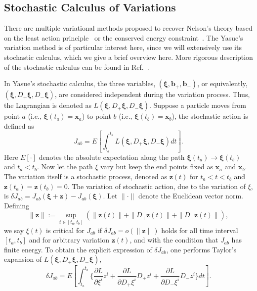 \documentclass[%
 aip, 
 amsmath,amssymb,amsthm,
 nofootinbib,
 reprint,
]{revtex4-1}
\begin{document}
\subsection{Stochastic Calculus of Variations}
\label{calculus}
There are multiple variational methods proposed to recover Nelson's theory based on the least action principle~\cite{Yasue, Guerra, Pavon} or the conserved energy constraint~\cite{Caticha}. The Yasue's variation method is of particular interest here, since we will extensively use its stochastic calculus, which we give a brief overview here. More rigorous description of the stochastic calculus can be found in Ref.~\cite{Yasue}.

In Yasue's stochastic calculus, the three variables, $(\mathbf{\xi, b_+, b_-})$, or equivalently, $(\mathbf{\xi}, D_+\mathbf{\xi}, D_-\mathbf{\xi})$, are considered independent during the variation process. Thus, the Lagrangian is denoted as $L(\mathbf{\xi}, D_+\mathbf{\xi}, D_-\mathbf{\xi})$. Suppose a particle moves from point $a$ (i.e., $\mathbf{\xi}(t_a)=\mathbf{x}_a$) to point $b$ (i.e., $\mathbf{\xi}(t_b)=\mathbf{x}_b$), the stochastic action is defined as 
\begin{equation}
    \label{action}
    J_{ab}=E[\int_{t_a}^{t_b} L(\mathbf{\xi}, D_+\mathbf{\xi}, D_-\mathbf{\xi}) dt].
\end{equation}
Here $E[\cdot]$ denotes the absolute expectation along the path $\mathbf{\xi}(t_a)\to\mathbf{\xi}(t_b)$ and $t_a < t_b$. Now let the path $\xi$ vary but keep the end points fixed as $\mathbf{x}_a$ and $\mathbf{x}_b$. The variation itself is a stochastic process, denoted as $\mathbf{z}(t)$ for $t_a<t<t_b$ and $\mathbf{z}(t_a)=\mathbf{z}(t_b)=0$. The variation of stochastic action, due to the variation of $\xi$, is $\delta J_{ab}=J_{ab}(\mathbf{\xi+z}) - J_{ab}(\mathbf{\xi})$. Let $\|\cdot\|$ denote the Euclidean vector norm. Defining
\begin{equation}
    \|\mathbf{z}\| := \sup_{t\in [t_a, t_b]}( \|\mathbf{z}(t)\| + \|D_+\mathbf{z}(t)\| + \|D_-\mathbf{z}(t)\|),
\end{equation}
we say $\xi(t)$ is critical for $J_{ab}$ if $\delta J_{ab}=o(\|\mathbf{z}\|)$ holds for all time interval $[t_a, t_b]$ and for arbitrary variation $\mathbf{z}(t)$, and with the condition that $J_{ab}$ has finite energy. To obtain the explicit expression of $\delta J_{ab}$, one performs Taylor's expansion of $L(\mathbf{\xi}, D_+\mathbf{\xi}, D_-\mathbf{\xi})$,
\begin{equation}
\label{dJ1}
    \delta J_{ab}=E[\int_{t_a}^{t_b}\{\frac{\partial L}{\partial \xi^i}z^i + \frac{\partial L}{\partial D_+\xi^i}D_+z^i + \frac{\partial L}{\partial D_-\xi^i}D_-z^i\}dt].
\end{equation}
\end{document}
